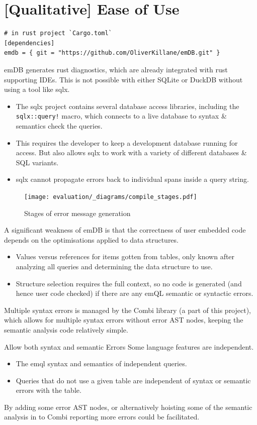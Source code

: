 \section{[Qualitative] Ease of Use}
\begin{verbatim}
# in rust project `Cargo.toml`
[dependencies]
emdb = { git = "https://github.com/OliverKillane/emDB.git" }
\end{verbatim}
emDB generates rust diagnostics, which are already integrated with rust supporting IDEs.
This is not possible with either SQLite or DuckDB without using a tool like sqlx.
\begin{itemize}
    \setlength\itemsep{0em}
    \item The sqlx project contains several database access libraries, including the
          \texttt{sqlx::query!} macro, which connects to a live database to syntax
          \& semantics check the queries.
    \item This requires the developer to keep a development database running for access. But also
          allows sqlx to work with a variety of different databases \& SQL variants.
    \item sqlx cannot propagate errors back to individual spans inside a query string.
\end{itemize}
\begin{figure}[h]
    \centering
    \texttt{[image: evaluation/\_diagrams/compile\_stages.pdf]}
    \caption{Stages of error message generation}
    \label{fig:error_message_gen}
\end{figure}
A significant weakness of emDB is that the correctness of user embedded code depends on the optimisations applied to data structures.
\begin{itemize}
    \setlength\itemsep{0em}
    \item Values versus references for items gotten from tables, only known after analyzing all queries and determining the data structure to use.
    \item Structure selection requires the full context, so no code is generated (and hence user code checked) if there are any emQL semantic or syntactic errors.
\end{itemize}
Multiple syntax errors is managed by the Combi library (a part of this project), which allows for multiple syntax errors without error AST nodes, keeping the semantic analysis code relatively simple.

\begin{futurebox}{Allow both syntax and semantic Errors}
    Some language features are independent.
    \begin{itemize}
        \setlength\itemsep{0em}
        \item The emql syntax and semantics of independent queries.
        \item Queries that do not use a given table are independent of syntax or semantic errors with the table.
    \end{itemize}
    By adding some error AST nodes, or alternatively hoisting some of the semantic analysis in to Combi reporting more errors could be facilitated.
\end{futurebox}

